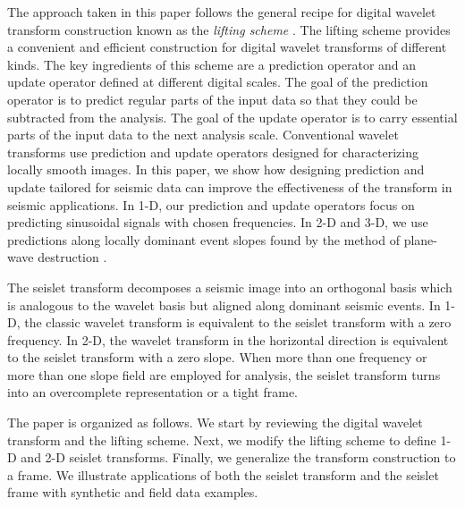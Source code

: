 The approach taken in this paper follows the general recipe for
digital wavelet transform construction known as the \emph{lifting
scheme} \cite[]{lifting}. The lifting scheme provides a convenient and
efficient construction for digital wavelet transforms of different
kinds. The key ingredients of this scheme are a prediction operator
and an update operator defined at different digital scales. The goal
of the prediction operator is to predict regular parts of the input
data so that they could be subtracted from the analysis. The goal of
the update operator is to carry essential parts of the input data to
the next analysis scale. Conventional wavelet transforms use
prediction and update operators designed for characterizing locally
smooth images.  In this paper, we show how designing prediction and
update tailored for seismic data can improve the effectiveness of the
transform in seismic applications. In 1-D, our prediction and update
operators focus on predicting sinusoidal signals with chosen
frequencies.  In 2-D and 3-D, we use predictions along locally
dominant event slopes found by the method of plane-wave destruction
\cite[]{pvi,GEO67-06-19461960}. 

The seislet transform decomposes a seismic image into an orthogonal
basis which is analogous to the wavelet basis but aligned along
dominant seismic events. In 1-D, the classic wavelet transform is
equivalent to the seislet transform with a zero frequency. In 2-D,
{the} wavelet transform in the horizontal direction is equivalent to the
seislet transform with a zero slope. When more than one frequency or
more than one slope field are employed for analysis, the seislet
transform turns into an overcomplete representation or a {tight}
frame.

The paper is organized as follows. We start by reviewing the digital
wavelet transform and the lifting scheme. Next, we modify the lifting
scheme to define 1-D and 2-D seislet
transforms. Finally, we generalize the transform construction to a
frame. We illustrate applications of both the seislet transform and
the seislet frame with synthetic and field data examples.




